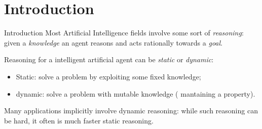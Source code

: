 \section*{Introduction}

\begin{frame}{Introduction}
    Most Artificial Intelligence fields involve some sort of \textit{reasoning}: given a \textit{knowledge} an agent reasons and acts rationally towards a \textit{goal}.

    Reasoning for a intelligent artificial agent can be \textit{static} or \textit{dynamic}:
    \begin{itemize}
        \item Static: solve a problem by exploiting some fixed knowledge;
        \item dynamic: solve a problem with mutable knowledge (\eg{} mantaining a property).
    \end{itemize}


    Many applications implicitly involve dynamic reasoning: 
    while such reasoning can be hard, it often is much faster \wrt{} static reasoning.
\end{frame}

